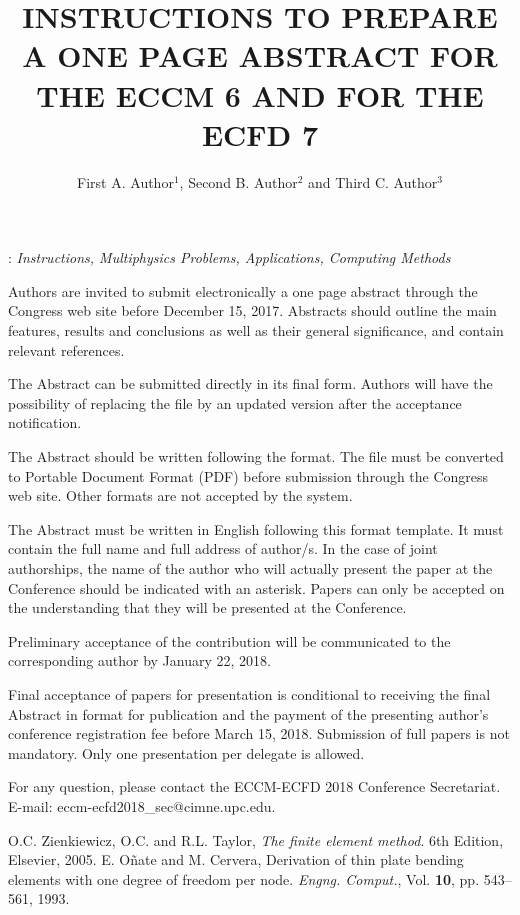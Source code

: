 \documentclass[12pt]{eccm-ecfd_abstract}
\title{INSTRUCTIONS TO PREPARE A ONE PAGE ABSTRACT FOR THE
ECCM 6 AND FOR THE ECFD 7}
\author{First A. Author$^{1}$, Second B. Author$^{2}$ and Third C. Author$^{3}$}
\begin{document}
: {\it Instructions, Multiphysics Problems, Applications, Computing Methods}
\vskip0.5cm

Authors are invited to submit electronically a one page abstract through the Congress web site before December 15, 2017. Abstracts should outline the main features, results and conclusions as well as their general significance, and contain relevant references.

The Abstract can be submitted directly in its final form. Authors will have the possibility of replacing the file by an updated version after the acceptance notification.

The Abstract should be written following the format. The file must be converted to Portable Document Format (PDF) before submission through the Congress web site. Other formats are not accepted by the system.

The Abstract must be written in English following this format template. It must contain the full name and full address of author/s. In the case of joint authorships, the name of the author who will actually present the paper at the Conference should be indicated with an asterisk. Papers can only be accepted on the understanding that they will be presented at the Conference.

Preliminary acceptance of the contribution will be communicated to the corresponding author by January 22, 2018.

Final acceptance of papers for presentation is conditional to receiving the final Abstract in format for publication and the payment of the presenting author's conference registration fee before March 15, 2018. Submission of full papers is not mandatory. Only one presentation per delegate is allowed.

For any question, please contact the ECCM-ECFD 2018 Conference Secretariat.
E-mail: eccm-ecfd2018\_sec@cimne.upc.edu.


\begin{thebibliography}{99}
  O.C. Zienkiewicz, O.C. and  R.L. Taylor,  \textit{The finite element method}. 6th Edition, Elsevier, 2005.
 E. O\~{n}ate and M. Cervera, Derivation of thin plate bending elements with one degree of freedom per node.
\textit{Engng. Comput.}, Vol. \textbf{10}, pp. 543--561, 1993. 
\end{thebibliography}
\end{document}
